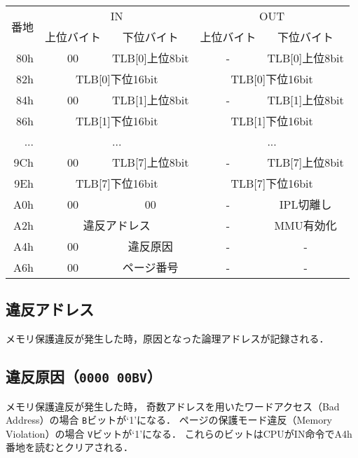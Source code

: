 \begin{center}
  \small\begin{tabular}{| r | c | c || c | c |}\hline
    \multirow{2}{*}{番地}
    & \multicolumn{2}{|c||}{IN}
    & \multicolumn{2}{c|}{OUT}
    \\\cline{2-5}
         & 上位バイト & 下位バイト & 上位バイト & 下位バイト
    \\\hline\hline
    80h  & 00 & TLB[0]上位8bit & - & TLB[0]上位8bit \\\hline
    82h  & \multicolumn{2}{|c||}{TLB[0]下位16bit}
         & \multicolumn{2}{|c|}{TLB[0]下位16bit} \\\hline
    84h  & 00 & TLB[1]上位8bit & - & TLB[1]上位8bit \\\hline
    86h  & \multicolumn{2}{|c||}{TLB[1]下位16bit}
         & \multicolumn{2}{|c|}{TLB[1]下位16bit} \\\hline
    ...  & \multicolumn{2}{|c||}{...}
         & \multicolumn{2}{|c|}{...}   \\\hline
    9Ch  & 00 & TLB[7]上位8bit & - & TLB[7]上位8bit \\\hline
    9Eh  & \multicolumn{2}{|c||}{TLB[7]下位16bit}
         & \multicolumn{2}{|c|}{TLB[7]下位16bit} \\\hline
    A0h  &  00 & 00
         &  -  & IPL切離し \\\hline
    A2h  &  \multicolumn{2}{|c||}{違反アドレス}
         &  -  & MMU有効化 \\\hline
    A4h  &  00 & 違反原因
         &  -  & - \\\hline
    A6h  &  00 & ページ番号
         &  -  & - \\\hline
  \end{tabular}
\end{center}

\subsection{違反アドレス}
  メモリ保護違反が発生した時，原因となった論理アドレスが記録される．

\subsection{違反原因（\texttt{0000 00BV}）}
  メモリ保護違反が発生した時，
  奇数アドレスを用いたワードアクセス（Bad Address）の場合
  \texttt{B}ビットが`1'になる．
  ページの保護モード違反（Memory Violation）の場合
  \texttt{V}ビットが`1'になる．
  これらのビットはCPUがIN命令でA4h番地を読むとクリアされる．

